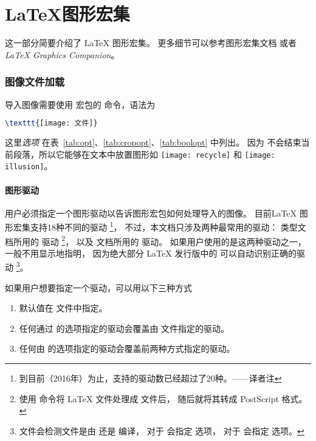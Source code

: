 \part{\LaTeX{}图形宏集}\label{part:graphicbundle}

这一部分简要介绍了 \LaTeX{} 图形宏集。
更多细节可以参考图形宏集文档 \cite{grfguide} 或者 \emph{\LaTeX{} Graphics Companion}\cite{Goossens1997}。

\section{图像文件加载}\label{sec:graphicsinclusion}

导入图像需要使用  宏包的 命令，语法为
\begin{lstlisting}[language=LaTeX,frame=shadowbox]
\texttt{[image: 文件]}
\end{lstlisting}
这里\emph{选项} 在表~\ref{tab:opt}、\ref{tab:cropopt}、\ref{tab:boolopt} 中列出。
因为  不会结束当前段落，所以它能够在文本中放置图形如
 \texttt{[image: recycle]} 和 \texttt{[image: illusion]}。

\subsection{图形驱动}\label{ssec:driver}
用户必须指定一个图形驱动以告诉图形宏包如何处理导入的图像。
目前\LaTeX{} 图形宏集支持18种不同的驱动
\footnote{
	到目前（2016年）为止，支持的驱动数已经超过了20种。——译者注
	}，
不过，本文档只涉及两种最常用的驱动：
 类型文档所用的  驱动
\footnote{使用  命令将 \LaTeX{} 文件处理成  文件后，
	 随后就将其转成 PostScript 格式。}，
以及 \pdfLaTeX{} 文档所用的  驱动。
如果用户使用的是这两种驱动之一，一般不用显示地指明，
因为绝大部分 \LaTeX{} 发行版中的  可以自动识别正确的驱动
\footnote{ 文件会检测文件是由  还是  编译，
	对于  会指定  选项，
	对于  会指定  选项。}。

如果用户想要指定一个驱动，可以用以下三种方式
\begin{enumerate}
	\item 默认值在  文件中指定。
	\item 任何通过  的选项指定的驱动会覆盖由  文件指定的驱动。
	\item 任何由  的选项指定的驱动会覆盖前两种方式指定的驱动。
\end{enumerate}

